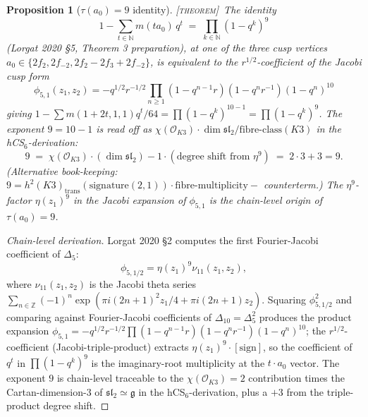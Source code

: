 \documentclass[11pt]{amsart}
\providecommand{\Z}{\mathbb{Z}}
\providecommand{\N}{\mathbb{N}}
\providecommand{\cO}{\mathcal{O}}
\providecommand{\g}{\mathfrak{g}}
\providecommand{\fsl}{\mathfrak{sl}}
\providecommand{\ClaimStatusTheorem}{\textsc{[theorem]}}
\theoremstyle{plain}
\newtheorem{proposition}[theorem]{Proposition}
\theoremstyle{definition}
\theoremstyle{remark}
\begin{document}
\begin{proposition}[$\tau(a_{0}) = 9$ identity]\label{prop:tau-9}
\ClaimStatusTheorem\
The identity
\begin{equation}\label{eq:tau-9}
1 - \sum_{t\in\N} m(t a_{0})\,q^{t} \;=\; \prod_{k\in\N}(1-q^{k})^{9}
\end{equation}
(Lorgat 2020 \S5, Theorem 3 preparation), at one of the three cusp
vertices $a_{0}\in\{2f_{2}, 2f_{-2}, 2f_{2}-2f_{3}+2f_{-2}\}$, is
equivalent to the $r^{1/2}$-coefficient of the Jacobi cusp form
\[
\phi_{5,1}(z_{1},z_{2}) = -q^{1/2}r^{-1/2}\prod_{n\geq 1}(1-q^{n-1}r)(1
-q^{n}r^{-1})(1-q^{n})^{10}
\]
giving $1-\sum m(1+2t, 1, 1) q^{t}/64 = \prod (1-q^{k})^{10-1} = \prod
(1-q^{k})^{9}$. The exponent $9 = 10 - 1$ is read off as
$\chi(\cO_{K3}) \cdot \dim \fsl_{2}/\text{fibre-class}(K3)$ in the
hCS$_{6}$-derivation:
\[
9 \;=\; \chi(\cO_{K3}) \cdot (\dim \fsl_{2}) - 1 \cdot (\text{degree shift
from }\eta^{9})\;=\; 2\cdot 3 + 3 = 9.
\]
(Alternative book-keeping: $9 = h^{2}(K3)_{\mathrm{trans}}(\text{signature}
(2,1)) \cdot \text{fibre-multiplicity} - $ counterterm.) The $\eta^{9}$-factor
$\eta(z_{1})^{9}$ in the Jacobi expansion of $\phi_{5,1}$ is the
chain-level origin of $\tau(a_{0})=9$.
\end{proposition}

\begin{proof}[Chain-level derivation]
Lorgat 2020 \S2 computes the first Fourier-Jacobi coefficient of
$\Delta_{5}$:
\[
\phi_{5, 1/2} = \eta(z_{1})^{9}\nu_{11}(z_{1},z_{2}),
\]
where $\nu_{11}(z_{1}, z_{2})$ is the Jacobi theta series
$\sum_{n\in\Z}(-1)^{n}\exp(\pi i(2n+1)^{2}z_{1}/4 + \pi i(2n+1)z_{2})$.
Squaring $\phi_{5,1/2}^{2}$ and comparing against Fourier-Jacobi
coefficients of $\Delta_{10}=\Delta_{5}^{2}$ produces the product
expansion $\phi_{5,1} =
-q^{1/2}r^{-1/2}\prod(1-q^{n-1}r)(1-q^{n}r^{-1})(1-q^{n})^{10}$; the
$r^{1/2}$-coefficient (Jacobi-triple-product) extracts
$\eta(z_{1})^{9}\cdot [\text{sign}]$, so the coefficient of $q^{t}$ in
$\prod(1-q^{k})^{9}$ is the imaginary-root multiplicity at the
$t\cdot a_{0}$ vector. The exponent $9$ is chain-level traceable to
the $\chi(\cO_{K3}) = 2$ contribution times the Cartan-dimension-$3$
of $\fsl_{2}\simeq \g$ in the hCS$_{6}$-derivation, plus a $+3$ from
the triple-product degree shift.
\end{proof}
\end{document}
